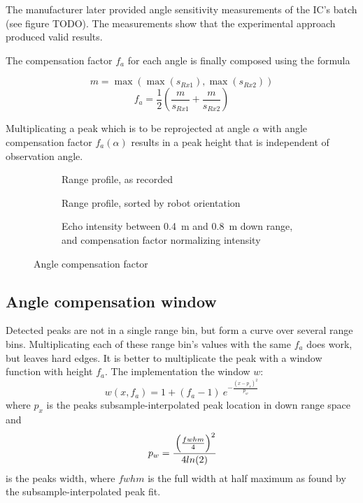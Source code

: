 The manufacturer later provided angle sensitivity measurements of the
IC's batch (see figure TODO). The measurements show that the
experimental approach produced valid results.

The compensation factor \(f_a\) for each angle is finally composed using
the formula

\[m = \max \left( \max (s_{Rx1}), \max (s_{Rx2}) \right)\] \[
f_a = \frac{1}{2}
  \left(
    \frac{m}{ s_{Rx1} } +
    \frac{m}{ s_{Rx2} }
  \right)
\]

Multiplicating a peak which is to be reprojected at angle \(\alpha\)
with angle compensation factor \(f_a(\alpha)\) results in a peak height
that is independent of observation angle.

\begin{figure}[htbp]
    \centering
    \begin{subfigure}{\textwidth}
        \centering
        \def\svgscale{0.8} \small
        
        \caption{Range profile, as recorded}
        \bigskip
    \end{subfigure}
    \begin{subfigure}{\textwidth}
        \centering
        \def\svgscale{0.8} \small
        
        \caption{Range profile, sorted by robot orientation}
        \bigskip
    \end{subfigure}
    \begin{subfigure}{\textwidth}
        \centering
        \def\svgscale{0.8} \small
        
        \caption{Echo intensity between \SI{0.4}{m} and \SI{0.8}{m} down range, and compensation factor normalizing intensity}
        \bigskip
    \end{subfigure}
    \caption{Angle compensation factor}
    \label{fig:fig_angle_compensation}
\end{figure}

\subsection{Angle compensation window}\label{angle-compensation-window}

Detected peaks are not in a single range bin, but form a curve over
several range bins. Multiplicating each of these range bin's values with
the same \(f_a\) does work, but leaves hard edges. It is better to
multiplicate the peak with a window function with height \(f_a\). The
implementation the window \(w\):
\[
w(x,f_a) = 1 + (f_a - 1) ~e ^ { -\frac{ \left( {x - p_x} \right) ^ 2 } {p_w} }
\] where \(p_x\) is the peaks subsample-interpolated peak location in
down range space and
\[
p_w = \cfrac{
\left( \frac{fwhm}{4}  \right) ^2
}{
4 ln(2)}
\]
is
the peaks width, where \(fwhm\) is the full width at half maximum as
found by the subsample-interpolated peak fit.

